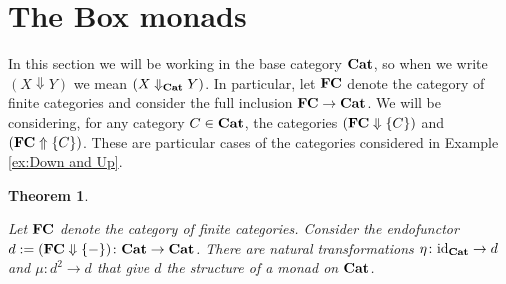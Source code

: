 \documentclass{amsart}
\newcommand{\longnote}[2][4.9in]{\fcolorbox{black}{yellow}{\parbox{#1}{\color{black} #2}}}
\def\tn{\textnormal}
\def\to{\rightarrow}
\def\taking{\colon}
\def\Down{\Downarrow}
\def\Up{\Uparrow}
\def\id{\tn{id}}
\def\Cat{{\bf Cat}}
\newtheorem{theorem}{Theorem}[section]
\theoremstyle{remark}
\theoremstyle{definition}
\def\FC{{\bf FC}}
\begin{document}
\section{The Box monads}

In this section we will be working in the base category $\Cat$, so when we write $(X\Down Y)$ we mean $(X\Down_\Cat Y)$.  In particular, let $\FC$ denote the category of finite categories and consider the full inclusion $\FC\to\Cat$.  We will be considering, for any category $C\in\Cat$, the categories $(\FC\Down\{C\})$ and $(\FC\Up\{C\})$.  These are particular cases of the categories considered in Example \ref{ex:Down and Up}.



\begin{theorem}\label{fc down is monad}

Let $\FC$ denote the category of finite categories.  Consider the endofunctor $d:=(\FC\Down\{-\})\taking\Cat\to\Cat$.  There are natural transformations $\eta\taking\id_\Cat\to d$ and $\mu\taking d^2\to d$ that give $d$ the structure of a monad on $\Cat$.  

\end{theorem}
\end{document}
